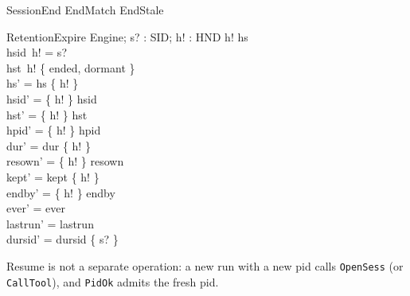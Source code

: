 \documentclass[a4paper,10pt,fleqn]{article}
\begin{document}
\begin{zed}
  SessionEnd  EndMatch \lor EndStale
\end{zed}

\begin{schema}{RetentionExpire}
  \Delta Engine; s? : SID; h! : HND
\where
  h! \in hs \\
  hsid~h! = s? \\
  hst~h! \in \{ ended, dormant \} \\
  hs' = hs \setminus \{ h! \} \\
  hsid' = \{ h! \} \ndres hsid \\
  hst' = \{ h! \} \ndres hst \\
  hpid' = \{ h! \} \ndres hpid \\
  dur' = dur \setminus \{ h! \} \\
  resown' = \{ h! \} \ndres resown \\
  kept' = kept \setminus \{ h! \} \\
  endby' = \{ h! \} \ndres endby \\
  ever' = ever \\
  lastrun' = lastrun \\
  dursid' = dursid \setminus \{ s? \}
\end{schema}

Resume is not a separate operation: a new run with a new pid calls
\texttt{OpenSess} (or \texttt{CallTool}), and \texttt{PidOk} admits the fresh
pid.
\end{document}

